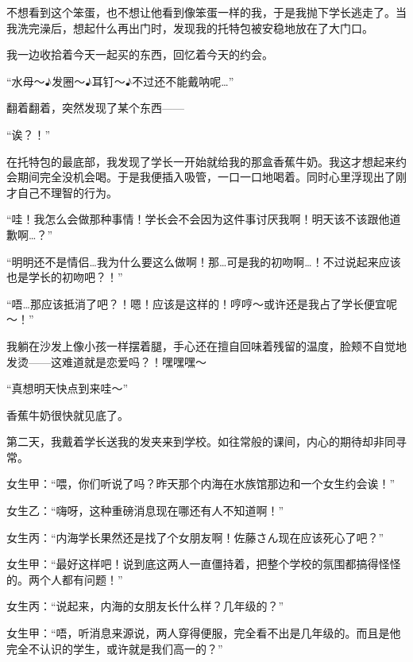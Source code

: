 不想看到这个笨蛋，也不想让他看到像笨蛋一样的我，于是我抛下学长逃走了。当我洗完澡后，想起什么再出门时，发现我的托特包被安稳地放在了大门口。

我一边收拾着今天一起买的东西，回忆着今天的约会。

%







“水母～$\eighthnote$发圈～$\eighthnote$耳钉～$\eighthnote$不过还不能戴呐呢…”

翻着翻着，突然发现了某个东西——

“诶？！”

在托特包的最底部，我发现了学长一开始就给我的那盒香蕉牛奶。我这才想起来约会期间完全没机会喝。于是我便插入吸管，一口一口地喝着。同时心里浮现出了刚才自己不理智的行为。

“哇！我怎么会做那种事情！学长会不会因为这件事讨厌我啊！明天该不该跟他道歉啊…？”

“明明还不是情侣…我为什么要这么做啊！那…可是我的初吻啊…！不过说起来应该也是学长的初吻吧？！”

“唔…那应该抵消了吧？！嗯！应该是这样的！哼哼～或许还是我占了学长便宜呢～！”

我躺在沙发上像小孩一样摆着腿，手心还在擅自回味着残留的温度，脸颊不自觉地发烫——这难道就是恋爱吗？！嘿嘿嘿～

“真想明天快点到来哇～”

香蕉牛奶很快就见底了。


\newday{\rainy}

第二天，我戴着学长送我的发夹来到学校。如往常般的课间，内心的期待却非同寻常。

女生甲：“喂，你们听说了吗？昨天那个内海在水族馆那边和一个女生约会诶！”

女生乙：“嗨呀，这种重磅消息现在哪还有人不知道啊！”

女生丙：“内海学长果然还是找了个女朋友啊！佐藤さん现在应该死心了吧？”

女生甲：“最好这样吧！说到底这两人一直僵持着，把整个学校的氛围都搞得怪怪的。两个人都有问题！”

女生丙：“说起来，内海的女朋友长什么样？几年级的？”

女生甲：“唔，听消息来源说，两人穿得便服，完全看不出是几年级的。而且是他完全不认识的学生，或许就是我们高一的？”

